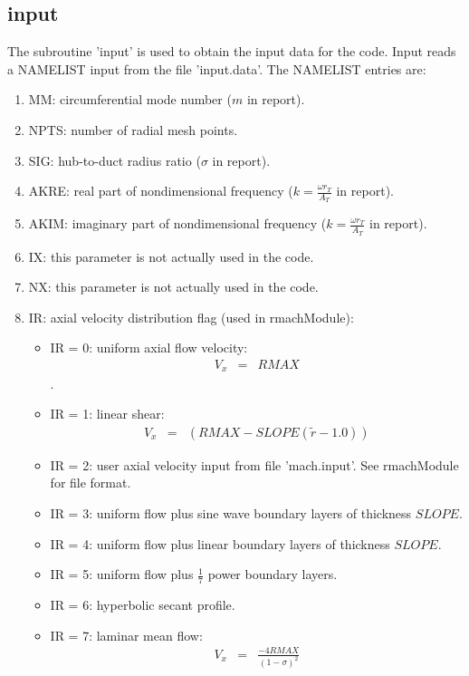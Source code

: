 \documentclass[12pt]{article}
\begin{document}
\subsection{input}

The subroutine 'input' is used to obtain the input data for the code.
Input reads a NAMELIST input from the file 'input.data'.  The NAMELIST
entries are:

\begin{enumerate}
\item{MM: circumferential mode number ($m$ in report).}
\item{NPTS: number of radial mesh points.}
\item{SIG: hub-to-duct radius ratio ($\sigma$ in report).}
\item{AKRE: real part of nondimensional frequency ($k = \frac{\omega r_T}{A_T}$ in report).}
\item{AKIM: imaginary part of nondimensional frequency ($k = \frac{\omega r_T}{A_T}$ in report).}
\item{IX: this parameter is not actually used in the code.}
\item{NX: this parameter is not actually used in the code.}
\item{IR: axial velocity distribution flag (used in rmachModule):
\begin{itemize}
\item{IR = 0: uniform axial flow velocity: 
\begin{eqnarray}
V_x &=& RMAX
\nonumber
\end{eqnarray}
}.
\item{IR = 1: linear shear: 
\begin{eqnarray}
V_x &=& \left(RMAX - SLOPE \left(\widetilde{r}-1.0 \right) \right)
\nonumber
\end{eqnarray}
}
\item{IR = 2: user axial velocity input from file 'mach.input'.  See rmachModule for
file format.
}
\item{IR = 3: uniform flow plus sine wave boundary layers of thickness $SLOPE$.
}
\item{IR = 4: uniform flow plus linear boundary layers of thickness $SLOPE$.
}
\item{IR = 5: uniform flow plus $\frac{1}{7}$ power boundary layers.
}
\item{IR = 6: hyperbolic secant profile.
}
\item{IR = 7: laminar mean flow:
\begin{eqnarray}
V_x &=& 
\frac{-4 RMAX}{\left(1-\sigma \right)^2}

\end{eqnarray}}
\end{itemize}}
\end{enumerate}
\end{document}
